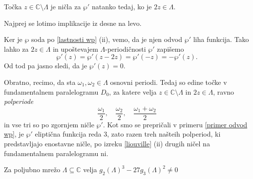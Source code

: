 \documentclass[mat1]{fmfdelo}
\newcommand{\C}{\mathbb C}
\newcommand{\om}{\omega}
\theoremstyle{definition}
\begin{document}
%
%
\begin{lema}
    \label{polperiode so nicle odvoda wp}
    Točka $z \in \C\setminus\Lambda$ je ničla za $\wp'$ natanko tedaj, ko je $2z \in \Lambda$.
\end{lema}

\begin{dokaz}
    Najprej se lotimo implikacije iz desne na levo.

    Ker je $\wp$ soda po \ref{lastnosti wp} (ii), vemo, da je njen odvod $\wp'$ liha funkcija. Tako lahko za $2z\in \Lambda$ in upoštevajem $\Lambda$-periodičnosti $\wp'$ zapišemo
    \[
        \wp'(z) = \wp'(z - 2z) = \wp'(-z) = -\wp'(z).
    \]
    Od tod pa jasno sledi, da je $\wp'(z) = 0$.

    Obratno, recimo, da sta $\om_1, \om_2 \in \Lambda$ osnovni periodi. Tedaj so edine točke v fundamentalnem paralelogramu $D_0$, za katere velja $z \in \C\setminus\Lambda$ in $2z\in\Lambda$, ravno \emph{polperiode}
    \[
        \frac{\om_1}{2}, \quad \frac{\om_2}{2}, \quad \frac{\om_1 + \om_2}{2} 
    \]
    in vse tri so po zgornjem ničle $\wp'$. Kot smo se prepričali v primeru \ref{primer odvod wp}, je $\wp'$ eliptična funkcija reda $3$, zato razen treh našteih polperiod, ki predstavljajo enostavne ničle, po izreku \ref{liouville} (ii) drugih ničel na fundamentalnem paralelogramu ni.   
\end{dokaz}

\begin{lema}
    Za poljubno mrežo $\Lambda \subseteq \C$ velja $g_2(\Lambda)^3 - 27g_3(\Lambda)^2 \neq 0$
\end{lema}
\end{document}
